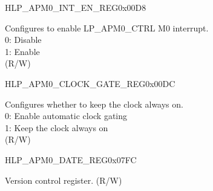 \begin{register}{H}{LP\_APM0\_INT\_EN\_REG}{0x00D8}\label{regdesc:LPAPM0INTENREG}
%
%
\regnewline%
\begin{regdesc}\begin{reglist}
\label{fielddesc:LPAPM0M0APMINTEN}\item [LP\_APM0\_M0\_APM\_INT\_EN] Configures to enable LP\_APM0\_CTRL M0 interrupt.\\ 
0: Disable \\ 
1: Enable  \\ (R/W)
\end{reglist}\end{regdesc}
\end{register}


\begin{register}{H}{LP\_APM0\_CLOCK\_GATE\_REG}{0x00DC}\label{regdesc:LPAPM0CLOCKGATEREG}
%
%
\regnewline%
\begin{regdesc}\begin{reglist}
\label{fielddesc:LPAPM0CLKEN}\item [LP\_APM0\_CLK\_EN] Configures whether to keep the clock always on.\\ 
0: Enable automatic clock gating \\ 
1: Keep the clock always on  \\ (R/W)
\end{reglist}\end{regdesc}
\end{register}


\begin{register}{H}{LP\_APM0\_DATE\_REG}{0x07FC}\label{regdesc:LPAPM0DATEREG}
%
%
\regnewline%
\begin{regdesc}\begin{reglist}
\label{fielddesc:LPAPM0DATE}\item [LP\_APM0\_DATE] Version control register. (R/W)
\end{reglist}\end{regdesc}
\end{register}


